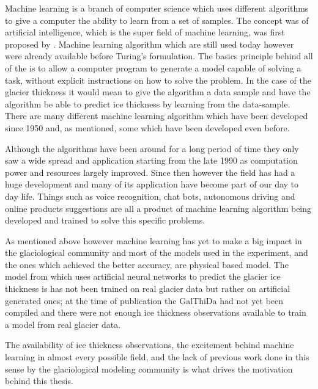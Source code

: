 Machine learning is a branch of computer science which uses different algorithms to give a computer the ability to learn from a set of samples. The concept was of artificial intelligence, which is the super field of machine learning, was first proposed by \citet{Turing1950}. Machine learning algorithm which are still used today however were already available before Turing's formulation. The basics principle behind all of the is to allow a computer program to generate a model capable of solving a task, without explicit instructions on how to solve the problem. In the case of the glacier thickness it would mean to give the algorithm a data sample and have the algorithm be able to predict ice thickness by learning from the data-sample. 
There are many different machine learning algorithm which have been developed since 1950 and, as mentioned, some which have been developed even before.

Although the algorithms have been around for a long period of time they only saw a wide spread and application starting from the late 1990 as computation power and resources largely improved. Since then however the field has had a huge development and many of its application have become part of our day to day life. Things such as voice recognition, chat bots, autonomous driving and online products suggestions are all a product of machine learning algorithm being developed and trained to solve this specific problems.

As mentioned above however machine learning has yet to make a big impact in the glaciological community and most of the models used in the experiment, and the ones which achieved the better accuracy, are physical based model. The model from \citet{Clarke2009} which uses artificial neural networks to predict the glacier ice thickness is has not been trained on real glacier data but rather on artificial generated ones; at the time of publication the GalThiDa had not yet been compiled and there were not enough ice thickness observations available to train a model from real glacier data.

The availability of ice thickness observations, the excitement behind machine learning in almost every possible field, and the lack of previous work done in this sense by the glaciological modeling community is what drives the motivation behind this thesis.


